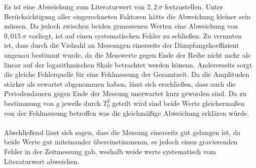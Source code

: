 Es ist eine Abweichung zum Literaturwert von $2,2\ \sigma$ festzustellen. Unter Berücksichtigung aller eingerechneten Faktoren
hätte die Abweichung kleiner sein müssen. Da jedoch zwischen beiden gemessenen Werten eine Abweichung von $0,015\ \sigma$ vorliegt, ist auf einen systematischen Fehler zu schließen.
Zu vermuten ist, dass durch die Vielzahl an Messungen einerseits der Dämpfungskoeffizient ungenau bestimmt wurde, da die
Messwerte gegen Ende der Reihe nicht mehr als linear auf der logarithmischen Skale betrachtet werden könenn. Andererseits
sorgt die gleiche Fehlerquelle für eine Fehlmessung der Gesamtzeit. Da die Amplituden stärker als erwartet abgenommen haben,
lässt sich erschließen, dass auch die Periodendauern gegen Ende der Messung unerwartet kurz geworden sind.
Da zu bestimmung von $g$ jeweils durch $T_0^2$ geteilt wird sind beide Werte gleichermaßen von der Fehlmessung betroffen
was die gleichmäßige Abweichung erklären würde. \\ \\
Abschließend lässt sich sagen, dass die Messung einerseits gut gelungen ist, da beide Werte gut miteinander übereinstimmenm, es jedoch einen gravierenden Fehler in der Zeitmessung
gab, weshalb weide werte systematisch vom Literaturwert abweichen.
